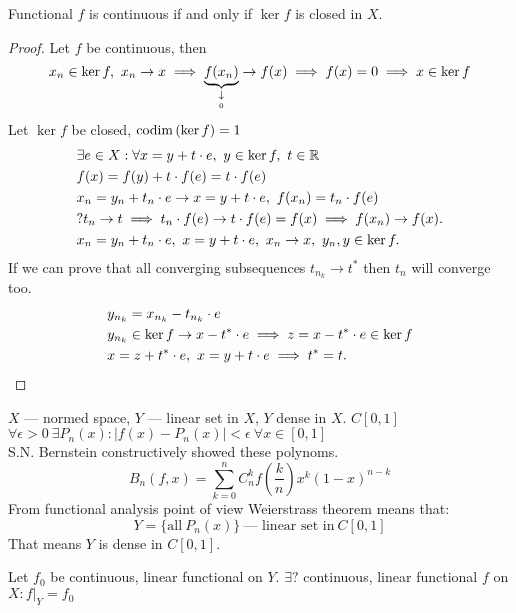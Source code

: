 \begin{thm}
  Functional $f$ is continuous if and only if $\ker{f}$ is closed in $X$.
\end{thm}

\begin{proof}
  Let $f$ be continuous, then 
  \[
    x_n \in \ker{f},\ x_n \to x \implies
    \underbrace{f(x_n)}_{\underset{0}{\downarrow}} \to f(x) \implies f(x) = 0 \implies x \in \ker{f}
  \]
  Let $\ker{f}$ be closed, $\operatorname{codim}{(\ker{f})} = 1$
  \begin{align*}
    &\exists e \in X : \forall x = y + t \cdot e,\ y \in \ker{f},\ t \in \mathbb{R} \\
    &f(x) = f(y) + t \cdot f(e) = t \cdot f(e) \\
    &x_n = y_n + t_n \cdot e \to x = y + t \cdot e,\ f(x_n) = t_n \cdot f(e)\\
    &?t_n \to t \implies t_n \cdot f(e) \to t \cdot f(e) = f(x) \implies f(x_n) \to
      f(x). \\
    &x_n = y_n + t_n \cdot e,\ x = y + t \cdot e,\ x_n \to x,\ y_n,y \in \ker{f}.
  \end{align*}
  If we can prove that all converging subsequences $t_{n_k} \to t^*$ then $t_n$ will
  converge too. 
  \begin{align*}
    &y_{n_k} = x_{n_k} - t_{n_k} \cdot e \\
    &y_{n_k} \in \ker{f} \to x - t^* \cdot e \implies z = x - t^*
      \cdot e \in \ker{f} \\
    &x = z + t^* \cdot e,\ x = y + t \cdot e \implies t^* = t. \qedhere
  \end{align*}
\end{proof}

\noindent
$X$ --- normed space, $Y$ --- linear set in $X$, $Y$ dense in $X$.
$C[0, 1]$ \\
$\forall \epsilon > 0\ \exists P_n(x) : |f(x) - P_n(x)| < \epsilon\ \forall x \in [0, 1]$\\ 
S.N. Bernstein constructively showed these polynoms.
\[
  B_n(f, x) = \sum\limits_{k = 0}^n C_n^k f(\dfrac{k}{n}) x^k (1 - x)^{n - k}
\]
From functional analysis point of view Weierstrass theorem means that:
\[
  Y = \{\text{all}\ P_n(x)\}\ \text{--- linear set in}\ C[0, 1]
\]
That means $Y$ is dense in $C[0, 1]$.

\begin{note}
  Let $f_0$ be continuous, linear functional on $Y$. $\exists ?$ continuous,
  linear functional $f$ on $X : f|_Y = f_0$
\end{note}

